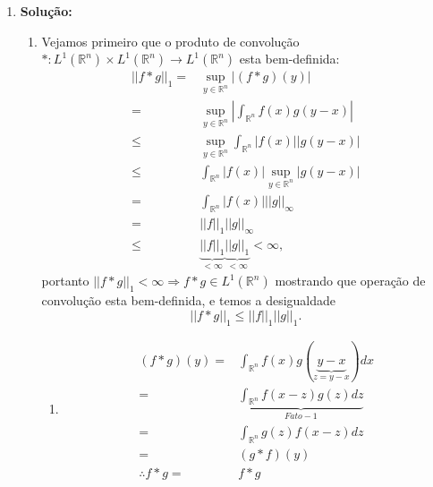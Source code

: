 \documentclass{article}
\begin{document}
\begin{enumerate}
		\item \textbf{Solução:}
			\begin{enumerate}
				\item 
				Vejamos primeiro que o produto de convolução $* : L^{1}(\mathbb{R}^{n}) \times L^{1}(\mathbb{R}^{n}) \to L^{1}(\mathbb{R}^{n})$ esta bem-definida:
				$$
				\begin{aligned}
				||f*g||_{1}=& \sup_{y \in \mathbb{R}^{n}}|(f*g)(y)|
				\\
				= &\sup_{y \in \mathbb{R}^{n}}|\int_{\mathbb{R}^{n} }f(x)g(y-x)| 
				\\
				\leq & \sup_{y \in \mathbb{R}^{n}}\int_{\mathbb{R}^{n} }|f(x)||g(y-x)|
				\\
				\leq & \int_{\mathbb{R}^{n} }|f(x)|\sup_{y \in \mathbb{R}^{n}}|g(y-x)|
				\\
				= & \int_{\mathbb{R}^{n} }|f(x)|||g||_{\infty}
				\\
				= & ||f||_{1}||g||_{\infty}
				\\
				\leq & \underbrace{ ||f||_{1} }_{<\infty} \underbrace{ ||g||_{1} }_{<\infty} < \infty,
				\end{aligned} 
				$$
				portanto $||f*g||_{1} < \infty \Rightarrow f*g \in L^{1}(\mathbb{R}^{n})$ mostrando que operação de convolução esta bem-definida, e temos a desigualdade 
				$$
				||f*g||_{1}\leq ||f||_{1}||g||_{1}.
				$$
				
					\begin{enumerate}
						\item 
						
						$$
						\begin{aligned}
						(f*g)(y) = & \int_{\mathbb{R}^{n}}f(x)g(\underbrace{ y-x }_{z=y-x})dx
						\\
						=& \underbrace{ \int_{\mathbb{R}^{n}}f(x-z)g(z)dz }_{Fato-1}
						\\
						= & \int_{\mathbb{R}^{n}}g(z)f(x-z)dz
						\\
						= & (g*f)(y)
						\\
						\therefore f*g = & f*g
						\end{aligned}
						$$
						

\end{enumerate}
\end{enumerate}
\end{enumerate}
\end{document}
